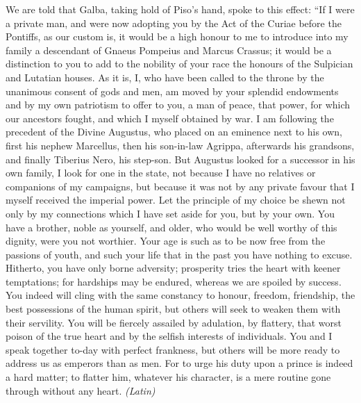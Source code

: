 We are told that Galba, taking hold of Piso's hand, spoke to this effect: ``If I were a private man, and were now adopting you by the Act of the Curiae before the Pontiffs, as our custom is, it would be a high honour to me to introduce into my family a descendant of Gnaeus Pompeius and Marcus Crassus; it would be a distinction to you to add to the nobility of your race the honours of the Sulpician and Lutatian houses. As it is, I, who have been called to the throne by the unanimous consent of gods and men, am moved by your splendid endowments and by my own patriotism to offer to you, a man of peace, that power, for which our ancestors fought, and which I myself obtained by war. I am following the precedent of the Divine Augustus, who placed on an eminence next to his own, first his nephew Marcellus, then his son-in-law Agrippa, afterwards his grandsons, and finally Tiberius Nero, his step-son. But Augustus looked for a successor in his own family, I look for one in the state, not because I have no relatives or companions of my campaigns, but because it was not by any private favour that I myself received the imperial power. Let the principle of my choice be shewn not only by my connections which I have set aside for you, but by your own. You have a brother, noble as yourself, and older, who would be well worthy of this dignity, were you not worthier. Your age is such as to be now free from the passions of youth, and such your life that in the past you have nothing to excuse. Hitherto, you have only borne adversity; prosperity tries the heart with keener temptations; for hardships may be endured, whereas we are spoiled by success. You indeed will cling with the same constancy to honour, freedom, friendship, the best possessions of the human spirit, but others will seek to weaken them with their servility. You will be fiercely assailed by adulation, by flattery, that worst poison of the true heart and by the selfish interests of individuals. You and I speak together to-day with perfect frankness, but others will be more ready to address us as emperors than as men. For to urge his duty upon a prince is indeed a hard matter; to flatter him, whatever his character, is a mere routine gone through without any heart. \emph{(Latin)}



